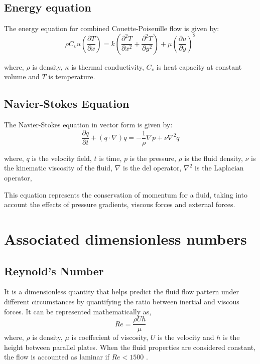 \documentclass[14pt,one side, a4paper]{extbook}
\begin{document}
	 	\subsection{Energy equation}
	 	The energy equation for combined Couette-Poiseuille flow is given by:
	 	\begin{equation}
	 	\rho C_{v}u\left(\frac{\partial T}{\partial x}\right)=k\left(\frac{\partial^{2}T}{\partial x^{2}}+\frac{\partial^{2}T}{\partial y^{2}}\right)+\mu\left(\frac{\partial u}{\partial y}\right)^{2}
	    \end{equation}
	 	
	 	where, $\rho$ is density, $\kappa$ is thermal conductivity, $C_v$ is heat capacity at constant volume and $T$ is temperature.
	 	
	 	\subsection{Navier-Stokes Equation}
	 	The Navier-Stokes equation in vector form is given by:
	 		\begin{equation}
	 		\frac{\partial q}{\partial t} + (q \cdot \nabla) q = -\frac{1}{\rho} \nabla p + \nu \nabla^2 q 
	 		\end{equation}
	 	
	 	where,
	 		$q$ is the velocity field,
	 		$t$  is time,
	 		$p$  is the pressure,
	 		\( \rho \) is the fluid density,
	 		\( \nu \) is the kinematic viscosity of the fluid,
	 		\( \nabla \) is the del operator,
	 		\( \nabla^2 \) is the Laplacian operator,
	 		
	 	This equation represents the conservation of momentum for a fluid, taking into account the effects of pressure gradients, viscous forces and external forces.
	 \section{Associated dimensionless numbers}
	 \subsection{Reynold's Number}
	 	It is a dimensionless quantity that helps predict the fluid flow pattern under different circumstances by quantifying the ratio between inertial and viscous forces. It can be represented mathematically as,
	 	$$Re=\frac{\rho U h}{\mu}$$
	 	where, $\rho$ is density, $\mu$ is coeffecient of viscosity, $U$ is the velocity and $h$ is the height between parallel plates. When the fluid properties are considered constant, the flow is accounted as laminar if $Re<1500$ \cite{gk10,frank,raisinghania}.
\end{document}
